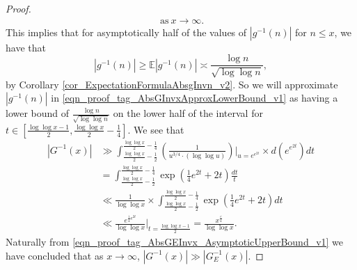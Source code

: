 \documentclass[11pt,reqno,a4letter]{article}
\numberwithin{figure}{section}
\numberwithin{table}{section}
\theoremstyle{plain}
\numberwithin{theorem}{section}
\theoremstyle{definition}
\begin{document}
\begin{proof}
\begin{align*}
     \mathrm{\ as\ } x \rightarrow \infty. 
\end{align*} 
This implies that for asymptotically half of the values of $|g^{-1}(n)|$ for $n \leq x$, 
we have that $$|g^{-1}(n)| \geq \mathbb{E}|g^{-1}(n)| \asymp \frac{\log n}{\sqrt{\log\log n}},$$ by 
Corollary \ref{cor_ExpectationFormulaAbsgInvn_v2}. 
So we will approximate $|g^{-1}(n)|$ in \eqref{eqn_proof_tag_AbsGInvxApproxLowerBound_v1} 
as having a lower bound of $\frac{\log n}{\sqrt{\log\log n}}$ on the lower half of the interval for 
$t \in \left[\frac{\log\log x-1}{2}, \frac{\log\log x}{2} - \frac{1}{4}\right]$. 
We see that 
\begin{align*} 
|G^{-1}(x)| & \gg \int_{\frac{\log\log x}{2} - \frac{1}{2}}^{\frac{\log\log x}{2} - \frac{1}{4}} 
     \left(\frac{1}{u^{3/4} \cdot (\log\log u)}\right) \Biggr\rvert_{u=e^{e^{2t}}} \times 
     d\left(e^{e^{2t}}\right) dt \\ 
     & = \int_{\frac{\log\log x}{2} - \frac{1}{2}}^{\frac{\log\log x}{2} - \frac{1}{4}} 
     \exp\left(\frac{1}{4}e^{2t} + 2t\right) \frac{dt}{t} \\ 
     & \ll \frac{1}{\log\log x} \times \int_{\frac{\log\log x}{2} - \frac{1}{2}}^{\frac{\log\log x}{2} - \frac{1}{4}} 
     \exp\left(\frac{1}{4}e^{2t} + 2t\right) dt \\ 
     & \ll \frac{e^{\frac{1}{4}e^{2t}}}{\log\log x} \Biggr\rvert_{t=\frac{\log\log x-1}{2}} = 
     \frac{x^{\frac{e}{4}}}{\log\log x}. 
\end{align*} 
Naturally from \eqref{eqn_proof_tag_AbsGEInvx_AsymptoticUpperBound_v1} we 
have concluded that as $x \rightarrow \infty$, 
$|G^{-1}(x)| \gg |G_E^{-1}(x)|$. 
\end{proof} 
\end{document}
